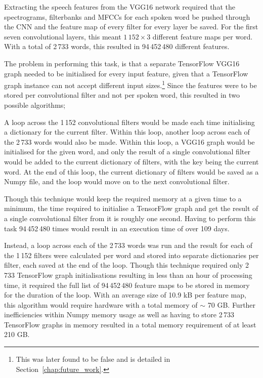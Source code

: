 Extracting the speech features from the VGG16 network required that the spectrograms, filterbanks and MFCCs for each spoken word be pushed through the CNN and the feature map of every filter for every layer be saved.
For the first seven convolutional layers, this meant $1\,152\times3$ different feature maps per word.
With a total of 2\,733 words, this resulted in 94\,452\,480 different features.

The problem in performing this task, is that a separate TensorFlow VGG16 graph needed to be initialised for every input feature, given that a TensorFlow graph instance can not accept different input sizes.\footnote{This was later found to be false and is detailed in Section~\ref{chap:future_work}.}
Since the features were to be stored per convolutional filter and not per spoken word, this resulted in two possible algorithms; 

A loop across the 1\,152 convolutional filters would be made each time initialising a dictionary for the current filter.
Within this loop, another loop across each of the 2\,733 words would also be made.
Within this loop, a VGG16 graph would be initialised for the given word, and only the result of a single convolutional filter would be added to the current dictionary of filters, with the key being the current word.
At the end of this loop, the current dictionary of filters would be saved as a Numpy file, and the loop would move on to the next convolutional filter.

Though this technique would keep the required memory at a given time to a minimum, the time required to initialise a TensorFlow graph and get the result of a single convolutional filter from it is roughly one second.
Having to perform this task 94\,452\,480 times would result in an execution time of over 109 days.

Instead, a loop across each of the 2\,733 words was run and the result for each of the 1\,152 filters were calculated per word and stored into separate dictionaries per filter, each saved at the end of the loop.
Though this technique required only 2\,733 TensorFlow graph initialisations resulting in less than an hour of processing time, it required the full list of 94\,452\,480 feature maps to be stored in memory for the duration of the loop.
With an average size of 10.9 kB per feature map, this algorithm would require hardware with a total memory of $\sim$ 70 GB.
Further inefficiencies within Numpy memory usage as well as having to store 2\,733 TensorFlow graphs in memory resulted in a total memory requirement of at least 210 GB.


